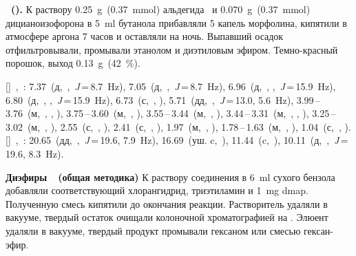 \textbf{~().} К раствору \SI{0.25}{\gram}~(\SI{0.37}{\mmol}) альдегида~\textbf{} и \SI{0.070}{\gram}~(\SI{0.37}{\mmol}) дицианоизофорона в \SI{5}{\milli\litre} бутанола прибавляли 5 капель морфолина, кипятили в атмосфере аргона 7 часов и оставляли на ночь. Выпавший осадок отфильтровывали, промывали этанолом и диэтиловым эфиром. Темно-красный порошок, выход \SI{0.13}{\gram}~(\SI{42}{\percent}).
\begin{experimental}
    []~\chemdelta,~\si{\ppm}: 7.37~(д,~,~\textit{J}\,=\,8.7~\si{\hertz}), 7.05~(д,~,~\textit{J}\,=\,8.7~\si{\hertz}), 6.96~(д,~, ,~\textit{J}\,=\,15.9~\si{\hertz}), 6.80~(д,~, ,~\textit{J}\,=\,15.9~\si{\hertz}), 6.73~(с,~, ), 5.71~(дд,~,~\textit{J}\,=\,13.0, 5.6~\si{\hertz}), 3.99\,--\,3.76~(м,~, , ), 3.75\,--\,3.60~(м,~, ), 3.55\,--\,3.44~(м,~, ), 3.44\,--\,3.31~(м,~, , ), 3.25\,--\,3.02~(м,~, ), 2.55~(с,~, ), 2.41~(с,~, ), 1.97~(м,~, ), 1.78\,--\,1.63~(м,~, ), 1.04~(с,~, ).
    []~\chemdelta,~\si{\ppm}: 20.65~(дд,~,~\textit{J}\,=\,19.6, 7.9~\si{\hertz}), 16.69~(уш. c,~), 11.44~(c,~), 10.11~(д,~,~\textit{J}\,=\,19.6, 8.3~\si{\hertz}).
\end{experimental}


\textbf{Диэфиры~~(общая методика)}
К раствору соединения  в \SI{6}{\milli\litre} сухого бензола добавляли соответствующий хлорангидрид, триэтиламин и \SI{1}{\milli\gram} \ac{dmap}.
Полученную смесь кипятили до окончания реакции.
Растворитель удаляли в вакууме, твердый остаток очищали колоночной хроматографией на .
Элюент удаляли в вакууме, твердый продукт промывали гексаном или смесью гексан-эфир.

